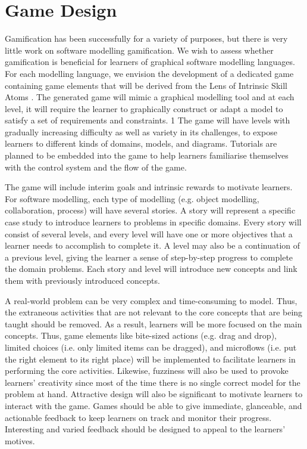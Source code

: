 \documentclass[12pt, a4paper]{report}
\begin{document}
\section{Game Design}
Gamification has been successfully for a variety of purposes, but there is very little work on software modelling gamification. We wish to assess whether gamification is beneficial for learners of graphical software modelling languages. For each modelling language, we envision the development of a dedicated game containing game elements that will be derived from the Lens of Intrinsic Skill Atoms \cite{deterding2015lens}. The generated game will mimic a graphical modelling tool and at each level, it will require the learner to graphically construct or adapt a model to satisfy a set of requirements and constraints.
	1
The game will have levels with gradually increasing difficulty as well as variety in its challenges, to expose learners to different kinds of domains, models, and diagrams. Tutorials are planned to be embedded into the game to help learners familiarise themselves with the control system and the flow of the game. 

The game will include interim goals and intrinsic rewards to motivate learners. For software modelling, each type of modelling (e.g. object modelling, collaboration, process) will have several stories. A story will represent a specific case study to introduce learners to problems in specific domains. Every story will consist of several levels, and every level will have one or more objectives that a learner needs to accomplish to complete it. A level may also be a continuation of a previous level, giving the learner a sense of step-by-step progress to complete the domain problems. Each story and level will introduce new concepts and link them with previously introduced concepts.

A real-world problem can be very complex and time-consuming to model. Thus, the extraneous activities that are not relevant to the core concepts that are being taught should be removed. As a result, learners will be more focused on the main concepts. Thus, game elements like bite-sized actions (e.g. drag and drop), limited choices (i.e. only limited items can be dragged), and microflows (i.e. put the right element to its right place) will be implemented to facilitate learners in performing the core activities. Likewise, fuzziness will also be used to provoke learners' creativity since most of the time there is no single correct model for the problem at hand. Attractive design will also be significant to motivate learners to interact with the game. Games should be able to give immediate, glanceable, and actionable feedback to keep learners on track and monitor their progress. Interesting and varied feedback should be designed to appeal to the learners' motives. 
\end{document}

